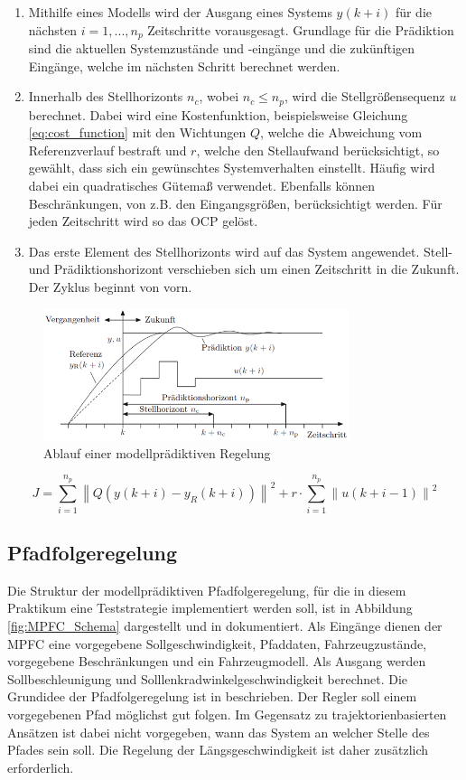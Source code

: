 \begin{enumerate}
    \item Mithilfe eines Modells wird der Ausgang eines Systems $y(k+i)$ für die nächsten $i = 1, ..., n_p$ Zeitschritte vorausgesagt. Grundlage für die Prädiktion sind die aktuellen Systemzustände und -eingänge und die zukünftigen Eingänge, welche im nächsten Schritt berechnet werden.
    \item Innerhalb des Stellhorizonts $n_c$, wobei $n_c \leq n_p$, wird die Stellgrößensequenz $u$ berechnet. Dabei wird eine Kostenfunktion, beispielsweise Gleichung \ref{eq:cost_function} mit den Wichtungen $Q$, welche die Abweichung vom Referenzverlauf bestraft und $r$, welche den Stellaufwand berücksichtigt, so gewählt, dass sich ein gewünschtes Systemverhalten einstellt. Häufig wird dabei ein quadratisches Gütemaß verwendet. Ebenfalls können Beschränkungen, von z.B. den Eingangsgrößen, berücksichtigt werden. Für jeden Zeitschritt wird so das OCP gelöst.
    \item Das erste Element des Stellhorizonts wird auf das System angewendet. Stell- und Prädiktionshorizont verschieben sich um einen Zeitschritt in die Zukunft. Der Zyklus beginnt von vorn. 
\end{enumerate}
\begin{figure}
    \centering
    \includegraphics[width=0.8\textwidth]{figures/2_Grundlagen/MPC_Diagramm.png}
    \caption{Ablauf einer modellprädiktiven Regelung \cite{adamy2014}}
    \label{fig:MPC}
\end{figure}
\begin{equation}
    J = \sum_{i=1}^{n_p} \left\| Q \left( y(k+i) - y_R(k+i) \right) \right\|^2 + r \cdot \sum_{i=1}^{n_p} \left\| u(k+i-1) \right\|^2
    \label{eq:cost_function}
\end{equation}

\subsection{Pfadfolgeregelung}
Die Struktur der modellprädiktiven Pfadfolgeregelung, für die in diesem Praktikum eine Teststrategie implementiert werden soll, ist in Abbildung \ref{fig:MPFC_Schema} dargestellt und in \cite{ritschel2019} dokumentiert. Als Eingänge dienen der MPFC eine vorgegebene Sollgeschwindigkeit, Pfaddaten, Fahrzeugzustände, vorgegebene Beschränkungen und ein Fahrzeugmodell. Als Ausgang werden Sollbeschleunigung und Solllenkradwinkelgeschwindigkeit berechnet. Die Grundidee der Pfadfolgeregelung ist in \cite{Faulwasser2009} beschrieben. Der Regler soll einem vorgegebenen Pfad möglichst gut folgen. Im Gegensatz zu trajektorienbasierten Ansätzen ist dabei nicht vorgegeben, wann das System an welcher Stelle des Pfades sein soll. Die Regelung der Längsgeschwindigkeit ist daher zusätzlich erforderlich. \medskip

